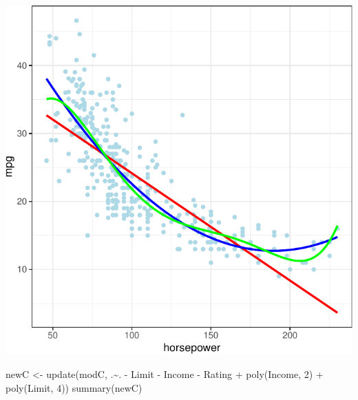 \documentclass[
]{article}
\newenvironment{Shaded}{\begin{snugshade}}{\end{snugshade}}
\newcommand{\DecValTok}[1]{\textcolor[rgb]{0.00,0.00,0.81}{#1}}
\newcommand{\FunctionTok}[1]{\textcolor[rgb]{0.00,0.00,0.00}{#1}}
\newcommand{\NormalTok}[1]{#1}
\newcommand{\OtherTok}[1]{\textcolor[rgb]{0.56,0.35,0.01}{#1}}
\newcommand{\SpecialCharTok}[1]{\textcolor[rgb]{0.00,0.00,0.00}{#1}}
\begin{document}
\begin{center}\includegraphics{SDM-CHAP24_files/figure-latex/smooth-1} \end{center}

\begin{Shaded}
\begin{Highlighting}[]
\NormalTok{newC }\OtherTok{\textless{}{-}} \FunctionTok{update}\NormalTok{(modC, .}\SpecialCharTok{\textasciitilde{}}\NormalTok{. }\SpecialCharTok{{-}}\NormalTok{ Limit }\SpecialCharTok{{-}}\NormalTok{ Income }\SpecialCharTok{{-}}\NormalTok{ Rating }\SpecialCharTok{+} \FunctionTok{poly}\NormalTok{(Income, }\DecValTok{2}\NormalTok{) }\SpecialCharTok{+} \FunctionTok{poly}\NormalTok{(Limit, }\DecValTok{4}\NormalTok{))}
\FunctionTok{summary}\NormalTok{(newC)}
\end{Highlighting}
\end{Shaded}
\end{document}
